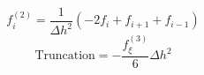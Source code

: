 \begin{equation} 
f^{{(2)}}_{i} = \frac{1}{{\Delta h}^{2}} \left(- 2 f_{i} + f_{{i+1}} + f_{{i-1}}\right)
 \end{equation} 
\begin{equation} 
\text{Truncation} = - \frac{f^{{(3)}}_{{\xi}}}{6} {\Delta h}^{2}
 \end{equation}